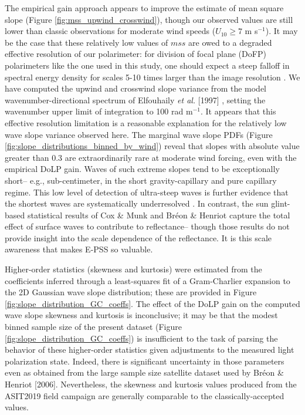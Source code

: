 \documentclass[letterpaper,journal]{IEEEtran}
\begin{document}
	The empirical gain approach appears to improve the estimate of mean square slope (Figure \ref{fig:mss_upwind_crosswind}), though our observed values are still lower than classic observations \cite{Cox1954a,Breon2006} for moderate wind speeds ($U_{10}\geq7$ m s$^{-1}$). It may be the case that these relatively low values of $mss$ are owed to a degraded effective resolution of our polarimeter: for division of focal plane (DoFP) polarimeters like the one used in this study, one should expect a steep falloff in spectral energy density for scales 5-10 times larger than the image resolution \cite{laxague_effects_2025}. We have computed the upwind and crosswind slope variance from the model wavenumber-directional spectrum of Elfouhaily \emph{et al.} [1997] \cite{Elfouhaily1997}, setting the wavenumber upper limit of integration to 100 rad m$^{-1}$. It appears that this effective resolution limitation \cite{laxague_effects_2025} is a reasonable explanation for the relatively low wave slope variance observed here. The marginal wave slope PDFs (Figure \ref{fig:slope_distributions_binned_by_wind}) reveal that slopes with absolute value greater than 0.3 are extraordinarily rare at moderate wind forcing, even with the empirical DoLP gain. Waves of such extreme slopes tend to be exceptionally short-- e.g., sub-centimeter, in the short gravity-capillary and pure capillary regime. This low level of detection of ultra-steep waves is further evidence that the shortest waves are systematically underresolved \cite{laxague_effects_2025}. In contrast, the sun glint-based statistical results of Cox \& Munk and Br\'eon \& Henriot capture the total effect of surface waves to contribute to reflectance-- though those results do not provide insight into the scale dependence of the reflectance. It is this scale awareness that makes E-PSS so valuable.
	
	Higher-order statistics (skewness and kurtosis) were estimated from the coefficients inferred through a least-squares fit of a Gram-Charlier expansion to the 2D Gaussian wave slope distribution; these are provided in Figure \ref{fig:slope_distribution_GC_coeffs}. The effect of the DoLP gain on the computed wave slope skewness and kurtosis is inconclusive; it may be that the modest binned sample size of the present dataset (Figure \ref{fig:slope_distribution_GC_coeffs}) is insufficient to the task of parsing the behavior of these higher-order statistics given adjustments to the measured light polarization state. Indeed, there is significant uncertainty in those parameters even as obtained from the large sample size satellite dataset used by Br\'eon \& Henriot [2006]. Nevertheless, the skewness and kurtosis values produced from the ASIT2019 field campaign are generally comparable to the classically-accepted values.
	
\end{document}
